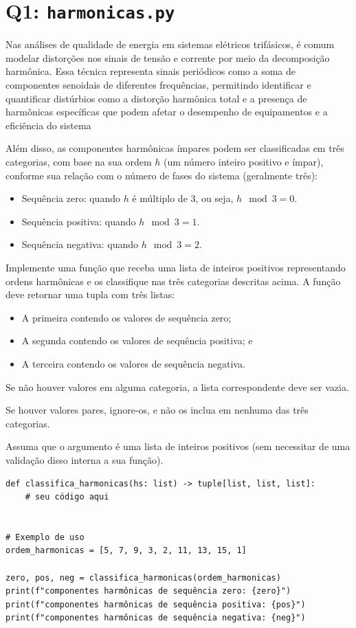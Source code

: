 \section*{Q1: \texttt{harmonicas.py}}

Nas análises de qualidade de energia em sistemas elétricos trifásicos, é comum modelar distorções nos sinais de tensão e
corrente por meio da decomposição harmônica.
Essa técnica representa sinais periódicos como a soma de componentes senoidais de diferentes frequências, permitindo
identificar e quantificar distúrbios como a distorção harmônica total e a presença de harmônicas específicas que podem
afetar o desempenho de equipamentos e a eficiência do sistema

Além disso, as componentes harmônicas ímpares podem ser classificadas em três categorias, com base na sua ordem $h$
(um número inteiro positivo e ímpar), conforme sua relação com o número de fases do sistema (geralmente três):


\begin{itemize}
\item Sequência zero: quando $h$ é múltiplo de 3, ou seja, $h \mod 3 = 0$.
\item Sequência positiva: quando $h \mod 3 = 1$.
\item Sequência negativa: quando $h \mod 3 = 2$.
\end{itemize}

Implemente uma função que receba uma lista de inteiros positivos representando ordens harmônicas e os
classifique nas três categorias descritas acima.
A função deve retornar uma tupla com três listas:
\begin{itemize}
\item A primeira contendo os valores de sequência zero;
\item A segunda contendo os valores de sequência positiva; e
\item A terceira contendo os valores de sequência negativa.
\end{itemize}


Se não houver valores em alguma categoria, a lista correspondente deve ser vazia.

Se houver valores pares, ignore-os, e não os inclua em nenhuma das três categorias.

Assuma que o argumento é uma lista de inteiros positivos (sem necessitar de uma validação disso interna a sua função).

\begin{verbatim}
def classifica_harmonicas(hs: list) -> tuple[list, list, list]:
    # seu código aqui


# Exemplo de uso
ordem_harmonicas = [5, 7, 9, 3, 2, 11, 13, 15, 1]

zero, pos, neg = classifica_harmonicas(ordem_harmonicas)
print(f"componentes harmônicas de sequência zero: {zero}")
print(f"componentes harmônicas de sequência positiva: {pos}")
print(f"componentes harmônicas de sequência negativa: {neg}")
\end{verbatim}

